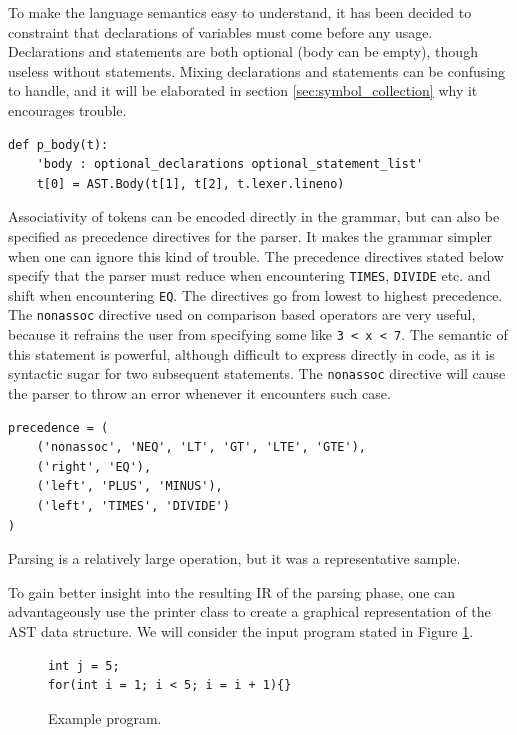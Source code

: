 To make the language semantics easy to understand, it has been decided to constraint that declarations of variables must come before any usage. Declarations and statements are both optional (body can be empty), though useless without statements. Mixing declarations and statements can be confusing to handle, and it will be elaborated in section \ref{sec:symbol_collection} why it encourages trouble.

\begin{verbatim}
def p_body(t):
    'body : optional_declarations optional_statement_list'
    t[0] = AST.Body(t[1], t[2], t.lexer.lineno)
\end{verbatim}

Associativity of tokens can be encoded directly in the grammar, but can also be specified as precedence directives for the parser. It makes the grammar simpler when one can ignore this kind of trouble. The precedence directives stated below specify that the parser must reduce when encountering \texttt{TIMES}, \texttt{DIVIDE} etc. and shift when encountering \texttt{EQ}. The directives go from lowest to highest precedence. The \texttt{nonassoc} directive used on comparison based operators are very useful, because it refrains the user from specifying some like \texttt{3 < x < 7}. The semantic of this statement is powerful, although difficult to express directly in code, as it is syntactic sugar for two subsequent statements. The \texttt{nonassoc} directive will cause the parser to throw an error whenever it encounters such case. 

\begin{verbatim}
precedence = (
    ('nonassoc', 'NEQ', 'LT', 'GT', 'LTE', 'GTE'),
    ('right', 'EQ'),
    ('left', 'PLUS', 'MINUS'),
    ('left', 'TIMES', 'DIVIDE')
)
\end{verbatim}

Parsing is a relatively large operation, but it was a representative sample.

To gain better insight into the resulting IR of the parsing phase, one can advantageously use the printer class to create a graphical representation of the AST data structure. We will consider the input program stated in Figure \ref{fig:ex_program}.

\begin{figure}[H]
\begin{verbatim}
int j = 5; 
for(int i = 1; i < 5; i = i + 1){}   
\end{verbatim}
    \caption{Example program.}
    \label{fig:ex_program}
\end{figure}

